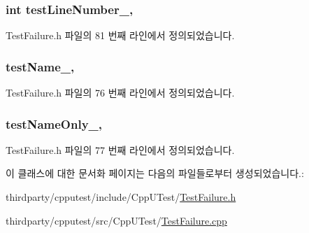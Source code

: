 \subsubsection[{\texorpdfstring{test\+Line\+Number\+\_\+}{testLineNumber_}}]{\setlength{\rightskip}{0pt plus 5cm}int test\+Line\+Number\+\_\+\hspace{0.3cm}{\ttfamily [protected]}, {\ttfamily [inherited]}}\hypertarget{class_test_failure_abb1f7af8e12fc84b16898aa5b410ba2a}{}\label{class_test_failure_abb1f7af8e12fc84b16898aa5b410ba2a}


Test\+Failure.\+h 파일의 81 번째 라인에서 정의되었습니다.

\subsubsection[{\texorpdfstring{test\+Name\+\_\+}{testName_}}]{ test\+Name\+\_\+\hspace{0.3cm}{\ttfamily [protected]}, {\ttfamily [inherited]}}\hypertarget{class_test_failure_afb42d7601608c3597c5279ddaf87e9d6}{}\label{class_test_failure_afb42d7601608c3597c5279ddaf87e9d6}


Test\+Failure.\+h 파일의 76 번째 라인에서 정의되었습니다.

\subsubsection[{\texorpdfstring{test\+Name\+Only\+\_\+}{testNameOnly_}}]{ test\+Name\+Only\+\_\+\hspace{0.3cm}{\ttfamily [protected]}, {\ttfamily [inherited]}}\hypertarget{class_test_failure_a60a0b2466b44483497e83d73b70241f2}{}\label{class_test_failure_a60a0b2466b44483497e83d73b70241f2}


Test\+Failure.\+h 파일의 77 번째 라인에서 정의되었습니다.



이 클래스에 대한 문서화 페이지는 다음의 파일들로부터 생성되었습니다.\+:\begin{DoxyCompactItemize}
\item 
thirdparty/cpputest/include/\+Cpp\+U\+Test/\hyperlink{_test_failure_8h}{Test\+Failure.\+h}\item 
thirdparty/cpputest/src/\+Cpp\+U\+Test/\hyperlink{_test_failure_8cpp}{Test\+Failure.\+cpp}\end{DoxyCompactItemize}
